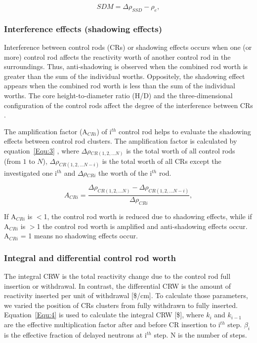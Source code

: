 \begin{equation}
\label{Equ:6}
{SDM}={{\Delta}{\rho}_{SSD}}-{{\rho}_{e}},
\end{equation}

\subsubsection{Interference effects (shadowing effects)}

Interference between control rods (CRs) or shadowing effects occurs when one 
(or more) control rod affects the reactivity worth of another control rod in 
the surroundings. Thus, anti-shadowing is observed when the combined rod worth 
is greater than the sum of the individual worths. Oppositely, the shadowing 
effect appears when the combined rod worth is less than the sum of the 
individual worths. The core height-to-diameter ratio (H/D) and the 
three-dimensional configuration of the control rods affect the degree of the 
interference between CRs \cite{girardin2007control}. 

The amplification factor (A$_{CRi}$) of i$^{th}$ control rod helps to evaluate the shadowing effects between control rod clusters. The amplification factor is calculated by equation~\ref{Equ:3} \cite{girardin2007control,vcerba2017optimization}, where $\Delta\rho$$_{CR(1,2,\ldots N)}$ is the total worth of all control rods (from $1$ to $N$), $\Delta\rho$$_{CR(1,2,\ldots N-i)}$ is the total worth of all CRs except the investigated one i$^{th}$ and $\Delta\rho$$_{CRi}$ the worth of the i$^{th}$ rod.

\begin{equation}
\label{Equ:3}
{{A}_{CRi}}=\dfrac{{{\Delta}{\rho}_{CR(1,2,\ldots N)}}-{{\Delta}{\rho}_{CR(1,2,\ldots N-i)}}}{{\Delta}{\rho}_{CRi}},
\end{equation}

If A$_{CRi}$ is $<$1, the control rod worth is reduced due to shadowing effects, while if A$_{CRi}$ is $>$1 the control rod worth is amplified and anti-shadowing effects occur. A$_{CRi}$ = 1 means no shadowing effects occur.

\subsubsection{Integral and differential control rod worth}

The integral CRW is the total reactivity change due to the control rod full 
insertion or withdrawal. In contrast, the differential CRW is the amount of 
reactivity inserted per unit of withdrawal [\$/cm]. To calculate those 
parameters, we varied the position of CRs clusters from fully withdrawn to 
fully inserted. Equation~\ref{Equ:4} is used to calculate the integral CRW 
[\$], where $k_{i}$ and $k_{i-1}$ are the effective multiplication factor 
after and before CR insertion to i$^{th}$ step. $\beta_{i}$ is the effective 
fraction of delayed neutrons at i$^{th}$ step. N is the number of steps.

